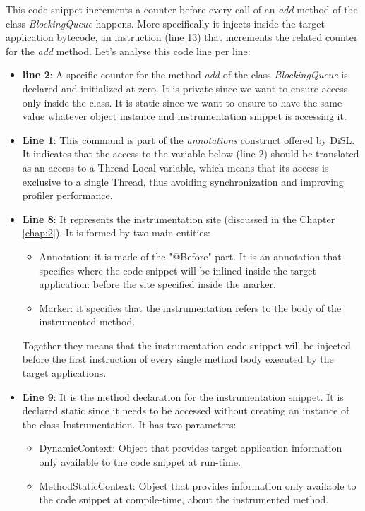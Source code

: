 \documentclass[]{usiinfthesis}
\begin{document}
\noindent
This code snippet increments a counter before every call of an \textit{add} method of the class \textit{BlockingQueue} happens. More specifically it injects inside the target application bytecode, an instruction (line 13) that increments the related counter for the \textit{add} method. Let's analyse this code line per line:

\begin{itemize}
    \item \textbf{line 2}: A specific counter for the method \textit{add} of the class \textit{BlockingQueue} is declared and initialized at zero. It is private since we want to ensure access only inside the class. It is static since we want to ensure to have the same value whatever object instance and instrumentation snippet is accessing it.
    
    \item \textbf{Line 1}: This command is part of the \textit{annotations} construct offered by DiSL. It indicates that the access to the variable below (line 2) should be translated as an access to a Thread-Local variable, which means that its access is exclusive to a single Thread, thus avoiding synchronization and improving profiler performance.
    
    \item \textbf{Line 8}: It represents the instrumentation site (discussed in the Chapter \ref{chap:2}). It is formed by two main entities:
    \begin{itemize}
        \item Annotation: it is made of the "@Before" part. It is an annotation that specifies where the code snippet will be inlined inside the target application: before the site specified inside the marker.
        \item Marker: it specifies that the instrumentation refers to the body of the instrumented method.
    \end{itemize}
    Together they means that the instrumentation code snippet will be injected before the first instruction of every single method body executed by the target applications.
    
    \item \textbf{Line 9}: It is the method declaration for the instrumentation snippet. It is declared static since it needs to be accessed without creating an instance of the class Instrumentation. It has two parameters:
    \begin{itemize}
        \item DynamicContext: Object that provides target application information only available to the code snippet at run-time.
        \item MethodStaticContext: Object that provides information only available to the code snippet at compile-time, about the instrumented method.
    \end{itemize}
    

\end{itemize}
\end{document}
